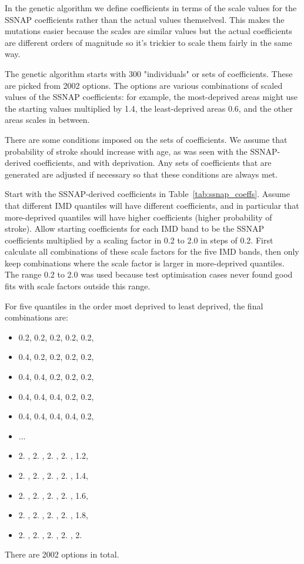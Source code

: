 \documentclass[12pt]{extarticle}
\begin{document}

In the genetic algorithm we define coefficients in terms of the scale values for the SSNAP coefficients rather than the actual values themselvesl. This makes the mutations easier because the scales are similar values but the actual coefficients are different orders of magnitude so it's trickier to scale them fairly in the same way.

The genetic algorithm starts with 300 "individuals" or sets of coefficients. These are picked from 2002 options. The options are various combinations of scaled values of the SSNAP coefficients: for example, the most-deprived areas might use the starting values multiplied by 1.4, the least-deprived areas 0.6, and the other areas scales in between.

There are some conditions imposed on the sets of coefficients.
We assume that probability of stroke should increase with age, as was seen with the SSNAP-derived coefficients, and with deprivation. Any sets of coefficients that are generated are adjusted if necessary so that these conditions are always met.


Start with the SSNAP-derived coefficients in Table~\ref{tab:ssnap_coeffs}.
Assume that different IMD quantiles will have different coefficients, and in particular that more-deprived quantiles will have higher coefficients (higher probability of stroke). 
Allow starting coefficients for each IMD band to be the SSNAP coefficients multiplied by a scaling factor in 0.2 to 2.0 in steps of 0.2.
First calculate all combinations of these scale factors for the five IMD bands, then only keep combinations where the scale factor is larger in more-deprived quantiles.
The range 0.2 to 2.0 was used because test optimisation cases never found good fits with scale factors outside this range.

For five quantiles in the order most deprived to least deprived, the final combinations are:
\begin{itemize}
    \item 0.2, 0.2, 0.2, 0.2, 0.2,
    \item 0.4, 0.2, 0.2, 0.2, 0.2,
    \item 0.4, 0.4, 0.2, 0.2, 0.2,
    \item 0.4, 0.4, 0.4, 0.2, 0.2,
    \item 0.4, 0.4, 0.4, 0.4, 0.2,
    \item ...
    \item 2. , 2. , 2. , 2. , 1.2,
    \item 2. , 2. , 2. , 2. , 1.4,
    \item 2. , 2. , 2. , 2. , 1.6,
    \item 2. , 2. , 2. , 2. , 1.8,
     \item 2. , 2. , 2. , 2. , 2.
\end{itemize}
There are 2002 options in total.
\end{document}
